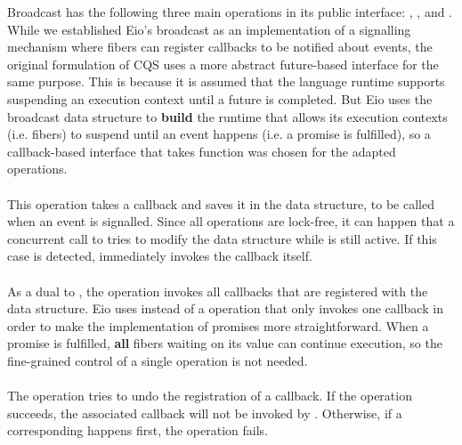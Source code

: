 Broadcast has the following three main operations in its public interface: , , and .
While we established Eio's broadcast as an implementation of a signalling mechanism where fibers can register callbacks to be notified about events, the original formulation of CQS uses a more abstract future-based interface for the same purpose.
This is because it is assumed that the language runtime supports suspending an execution context until a future is completed.
But Eio uses the broadcast data structure to \textbf{build} the runtime that allows its execution contexts (i.e. fibers) to suspend until an event happens (i.e. a promise is fulfilled), so a callback-based interface that takes  function was chosen for the adapted operations.

\paragraph*{}
This operation takes a callback and saves it in the data structure, to be called when an event is signalled. 
Since all operations are lock-free, it can happen that a concurrent call to  tries to modify the data structure while  is still active.
If this case is detected,  immediately invokes the callback itself.

\paragraph*{}
As a dual to , the  operation invokes all callbacks that are registered with the data structure.
Eio uses  instead of a  operation that only invokes one callback in order to make the implementation of promises more straightforward.
When a promise is fulfilled, \textbf{all} fibers waiting on its value can continue execution, so the fine-grained control of a single  operation is not needed.

\paragraph*{}
The  operation tries to undo the registration of a callback.
If the operation succeeds, the associated callback will not be invoked by . 
Otherwise, if a corresponding  happens first, the operation fails.

